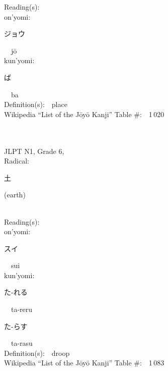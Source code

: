 \begin{multicols}{2}
Reading(s):\ \ \\
{\hspace*{1em}}on'yomi:\ \ \\
{\hspace*{2em}}{\begin{CJK}{UTF8}{min} ジョウ \end{CJK}}\ \ j\=o\ \ \\
{\hspace*{1em}}kun'yomi:\ \ \\
{\hspace*{2em}}{\begin{CJK}{UTF8}{min} ば \end{CJK}}\ \ ba\ \ \\
Definition(s):\ \ place \\
Wikipedia ``List of the J\=oy\=o Kanji'' Table \#:\ \ 1\,020 \\
\ \ \\
{\fontsize{34pt}{40pt}  }\ \ \\  %
{JLPT N1, Grade 6, \\Radical:\ \ {\begin{CJK}{UTF8}{min} 土 \end{CJK}} (earth) } \\
Reading(s):\ \ \\
{\hspace*{1em}}on'yomi:\ \ \\
{\hspace*{2em}}{\begin{CJK}{UTF8}{min} スイ \end{CJK}}\ \ sui\ \ \\
{\hspace*{1em}}kun'yomi:\ \ \\
{\hspace*{2em}}{\begin{CJK}{UTF8}{min} た-れる \end{CJK}}\ \ ta-reru\ \ \\
{\hspace*{2em}}{\begin{CJK}{UTF8}{min} た-らす \end{CJK}}\ \ ta-rasu\ \ \\
Definition(s):\ \ droop \\
Wikipedia ``List of the J\=oy\=o Kanji'' Table \#:\ \ 1\,083 \\

\end{multicols}
